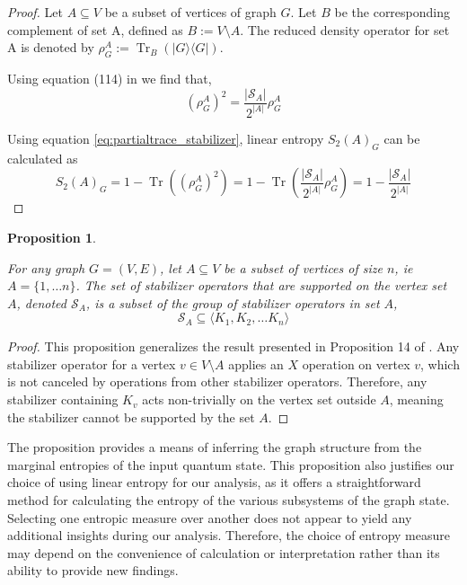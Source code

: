 \documentclass{article}
\newtheorem{prop}[theorem]{Proposition}
\DeclareMathOperator{\Tr}{Tr}
\newcommand{\ket}[1]{|#1\rangle}
\newcommand{\bra}[1]{\langle #1|}
\begin{document}
\begin{proof}
     Let $A \subseteq V$ be a subset of vertices of graph $G$. Let $B$ be the corresponding complement of set A, defined as $B := V\setminus A$. The reduced density operator for set A is denoted by $\rho^A_G := \Tr_B(\ket{G}\bra{G})$. 
     
    Using equation (114) in \cite{hein2006entanglement} we find that,
    \begin{equation}
    \label{eq:partialtrace_stabilizer}
        (\rho^A_G)^2 = \frac{|\mathcal{S}_A|}{2^{|A|}} \rho^A_G
    \end{equation}
    
    Using equation \eqref{eq:partialtrace_stabilizer}, linear entropy $S_2(A)_{G}$ can be calculated as
    \begin{equation}
        S_2(A)_{G} = 1 - \Tr{((\rho^A_G)^2)} = 1 -  \Tr\left( \frac{|\mathcal{S}_A|}{2^{|A|}} \rho^A_G \right) =1 - \frac{|\mathcal{S}_A|}{2^{|A|}}
    \end{equation}
\end{proof}


\begin{prop}
\label{prop:support_stabilizer_subset_of_group_of_stablizer_operator}

For any graph $ G = (V, E) $, let $ A \subseteq V $ be a subset of vertices of size $n$, ie $A = \{1, \dots n\}$. The set of stabilizer operators that are supported on the vertex set $ A $, denoted $ \mathcal{S}_A $, is a subset of the  group of stabilizer operators in set $A$, 
\begin{equation}
\label{eq:support_stabilizer_subset_of_group_of_stablizer_operator}
\mathcal{S}_A \subseteq \langle K_1, K_2, \dots K_n \rangle
\end{equation}
\end{prop}
\begin{proof}
   This proposition generalizes the result presented in Proposition 14 of \cite{hein2006entanglement}. Any stabilizer operator for a vertex $v \in V \setminus A$ applies an $X$ operation on vertex $v$, which is not canceled by operations from other stabilizer operators. Therefore, any stabilizer containing $K_v$ acts non-trivially on the vertex set outside $A$, meaning the stabilizer cannot be supported by the set $A$.
\end{proof}


The proposition provides a means of inferring the graph structure from the marginal entropies of the input quantum state. This proposition also justifies our choice of using linear entropy for our analysis, as it offers a straightforward method for calculating the entropy of the various subsystems of the graph state. Selecting one entropic measure over another does not appear to yield any additional insights during our analysis. Therefore, the choice of entropy measure may depend on the convenience of calculation or interpretation rather than its ability to provide new findings.
\end{document}
